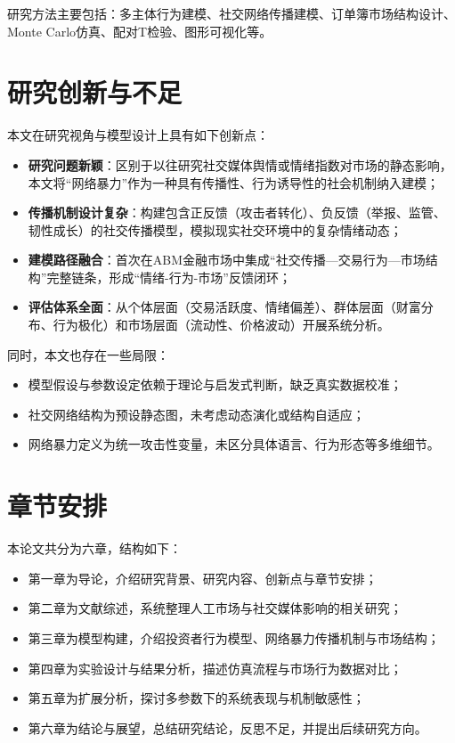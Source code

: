 研究方法主要包括：多主体行为建模、社交网络传播建模、订单簿市场结构设计、Monte Carlo仿真、配对T检验、图形可视化等。

\section{研究创新与不足}

本文在研究视角与模型设计上具有如下创新点：

\begin{itemize}
  \item \textbf{研究问题新颖}：区别于以往研究社交媒体舆情或情绪指数对市场的静态影响，本文将“网络暴力”作为一种具有传播性、行为诱导性的社会机制纳入建模；
  \item \textbf{传播机制设计复杂}：构建包含正反馈（攻击者转化）、负反馈（举报、监管、韧性成长）的社交传播模型，模拟现实社交环境中的复杂情绪动态；
  \item \textbf{建模路径融合}：首次在ABM金融市场中集成“社交传播—交易行为—市场结构”完整链条，形成“情绪-行为-市场”反馈闭环；
  \item \textbf{评估体系全面}：从个体层面（交易活跃度、情绪偏差）、群体层面（财富分布、行为极化）和市场层面（流动性、价格波动）开展系统分析。
\end{itemize}

同时，本文也存在一些局限：

\begin{itemize}
  \item 模型假设与参数设定依赖于理论与启发式判断，缺乏真实数据校准；
  \item 社交网络结构为预设静态图，未考虑动态演化或结构自适应；
  \item 网络暴力定义为统一攻击性变量，未区分具体语言、行为形态等多维细节。
\end{itemize}

\section{章节安排}

本论文共分为六章，结构如下：

\begin{itemize}
  \item 第一章为导论，介绍研究背景、研究内容、创新点与章节安排；
  \item 第二章为文献综述，系统整理人工市场与社交媒体影响的相关研究；
  \item 第三章为模型构建，介绍投资者行为模型、网络暴力传播机制与市场结构；
  \item 第四章为实验设计与结果分析，描述仿真流程与市场行为数据对比；
  \item 第五章为扩展分析，探讨多参数下的系统表现与机制敏感性；
  \item 第六章为结论与展望，总结研究结论，反思不足，并提出后续研究方向。
\end{itemize}
